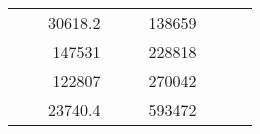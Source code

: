 \begin{table}[H]
\begin{tabular}{|ccrccrccc}
\multicolumn{1}{|c|}{\cellcolor[HTML]{FFFFC7}}                                & \multicolumn{1}{c|}{\cellcolor[HTML]{DDFDFF}}                      & \multicolumn{1}{r|}{\cellcolor[HTML]{DAE8FC}30618.2}   & \multicolumn{1}{c|}{\cellcolor[HTML]{FFFFC7}}                                & \multicolumn{1}{c|}{\cellcolor[HTML]{DDFDFF}}                       & \multicolumn{1}{r|}{\cellcolor[HTML]{DDFDFF}138659}    &                                                                              &                                                                    &                                                        \\ \cline{3-3} \cline{6-6}
\multicolumn{1}{|c|}{\cellcolor[HTML]{FFFFC7}}                                & \multicolumn{1}{c|}{\cellcolor[HTML]{DDFDFF}}                      & \multicolumn{1}{r|}{\cellcolor[HTML]{DDFDFF}147531}    & \multicolumn{1}{c|}{\cellcolor[HTML]{FFFFC7}}                                & \multicolumn{1}{c|}{\cellcolor[HTML]{DDFDFF}}                       & \multicolumn{1}{r|}{\cellcolor[HTML]{DAE8FC}228818}    &                                                                              &                                                                    &                                                        \\ \cline{3-3} \cline{6-6}
\multicolumn{1}{|c|}{\cellcolor[HTML]{FFFFC7}}                                & \multicolumn{1}{c|}{\cellcolor[HTML]{DDFDFF}}                      & \multicolumn{1}{r|}{\cellcolor[HTML]{DAE8FC}122807}    & \multicolumn{1}{c|}{\cellcolor[HTML]{FFFFC7}}                                & \multicolumn{1}{c|}{\cellcolor[HTML]{DDFDFF}}                       & \multicolumn{1}{r|}{\cellcolor[HTML]{DDFDFF}270042}    &                                                                              &                                                                    &                                                        \\ \cline{3-3} \cline{6-6}
\multicolumn{1}{|c|}{\cellcolor[HTML]{FFFFC7}}                                & \multicolumn{1}{c|}{\cellcolor[HTML]{DDFDFF}}                      & \multicolumn{1}{r|}{\cellcolor[HTML]{DDFDFF}23740.4}   & \multicolumn{1}{c|}{\cellcolor[HTML]{FFFFC7}}                                & \multicolumn{1}{c|}{\cellcolor[HTML]{DDFDFF}}                       & \multicolumn{1}{r|}{\cellcolor[HTML]{DAE8FC}593472}    &                                                                              &                                                                    &                                                        \\ \cline{3-3} \cline{6-6}

\end{tabular}
\end{table}
